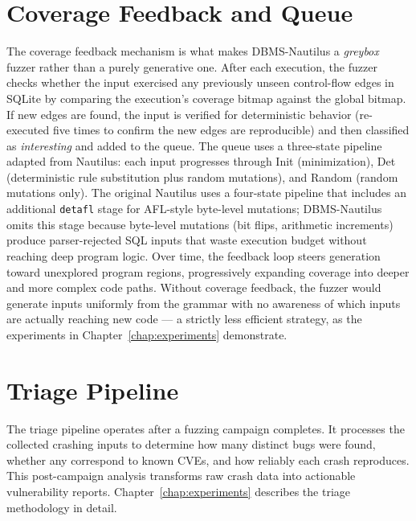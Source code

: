 \section{Coverage Feedback and Queue}
The coverage feedback mechanism is what makes DBMS-Nautilus a \textit{greybox} fuzzer rather than a purely generative one. After each execution, the fuzzer checks whether the input exercised any previously unseen control-flow edges in SQLite by comparing the execution's coverage bitmap against the global bitmap. If new edges are found, the input is verified for deterministic behavior (re-executed five times to confirm the new edges are reproducible) and then classified as \textit{interesting} and added to the queue. The queue uses a three-state pipeline adapted from Nautilus: each input progresses through Init (minimization), Det (deterministic rule substitution plus random mutations), and Random (random mutations only). The original Nautilus uses a four-state pipeline that includes an additional \texttt{detafl} stage for AFL-style byte-level mutations; DBMS-Nautilus omits this stage because byte-level mutations (bit flips, arithmetic increments) produce parser-rejected SQL inputs that waste execution budget without reaching deep program logic. Over time, the feedback loop steers generation toward unexplored program regions, progressively expanding coverage into deeper and more complex code paths. Without coverage feedback, the fuzzer would generate inputs uniformly from the grammar with no awareness of which inputs are actually reaching new code --- a strictly less efficient strategy, as the experiments in Chapter~\ref{chap:experiments} demonstrate.

\section{Triage Pipeline}
The triage pipeline operates after a fuzzing campaign completes. It processes the collected crashing inputs to determine how many distinct bugs were found, whether any correspond to known CVEs, and how reliably each crash reproduces. This post-campaign analysis transforms raw crash data into actionable vulnerability reports. Chapter~\ref{chap:experiments} describes the triage methodology in detail.

